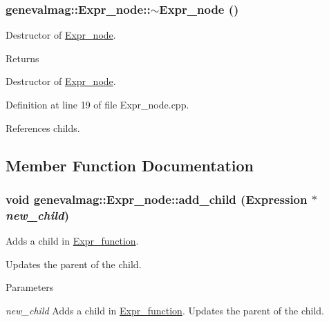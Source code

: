 \hypertarget{classgenevalmag_1_1Expr__node_aed3c4a68961a70c4f41bf100bfac7db9}{
\subsubsection[{$\sim$Expr\_\-node}]{\setlength{\rightskip}{0pt plus 5cm}genevalmag::Expr\_\-node::$\sim$Expr\_\-node ()}}
\label{classgenevalmag_1_1Expr__node_aed3c4a68961a70c4f41bf100bfac7db9}
Destructor of \hyperlink{classgenevalmag_1_1Expr__node}{Expr\_\-node}. \begin{DoxyReturn}{Returns}

\end{DoxyReturn}
Destructor of \hyperlink{classgenevalmag_1_1Expr__node}{Expr\_\-node}. 

Definition at line 19 of file Expr\_\-node.cpp.



References childs.



\subsection{Member Function Documentation}
\hypertarget{classgenevalmag_1_1Expr__node_a11c96ee7ecda3b52639b2f8879aafea2}{
\subsubsection[{add\_\-child}]{\setlength{\rightskip}{0pt plus 5cm}void genevalmag::Expr\_\-node::add\_\-child ({\bf Expression} $\ast$ {\em new\_\-child})}}
\label{classgenevalmag_1_1Expr__node_a11c96ee7ecda3b52639b2f8879aafea2}
Adds a child in \hyperlink{classgenevalmag_1_1Expr__function}{Expr\_\-function}.\par
 Updates the parent of the child. 
\begin{DoxyParams}{Parameters}
\item[{\em new\_\-child}]Adds a child in \hyperlink{classgenevalmag_1_1Expr__function}{Expr\_\-function}. Updates the parent of the child. \end{DoxyParams}


